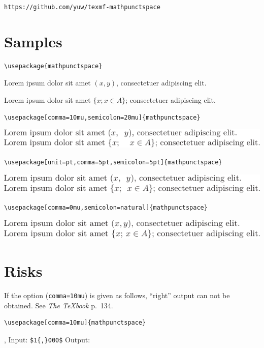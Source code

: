 \documentclass{article}
\begin{document}
\texttt{https://github.com/yuw/texmf-mathpunctspace}

\section{Samples}

\begin{verbatim}
\usepackage{mathpunctspace}
\end{verbatim}

Lorem ipsum dolor sit amet $(x, y)$, consectetuer adipiscing elit.

Lorem ipsum dolor sit amet $\{x; x \in A\}$; consectetuer adipiscing elit.

\begin{verbatim}
\usepackage[comma=10mu,semicolon=20mu]{mathpunctspace}
\end{verbatim}

\includegraphics{comma10mu-semicolon20mu.pdf}

\begin{verbatim}
\usepackage[unit=pt,comma=5pt,semicolon=5pt]{mathpunctspace}
\end{verbatim}

\includegraphics{comma5pt-semicolon5pt.pdf}

\begin{verbatim}
\usepackage[comma=0mu,semicolon=natural]{mathpunctspace}
\end{verbatim}

\includegraphics{comma0mu-semicolonnat.pdf}

\section{Risks}

If the option (\texttt{comma=10mu}) is given as follows, ``right'' output can not be obtained. See \textit{The \TeX{}book} p.~134.

\begin{verbatim}
\usepackage[comma=10mu]{mathpunctspace}
\end{verbatim}

\begin{center}
 \hbox{,}%
 Input: \verb!$1{,}000$!\qquad
 Output: 
\end{center}
\end{document}
